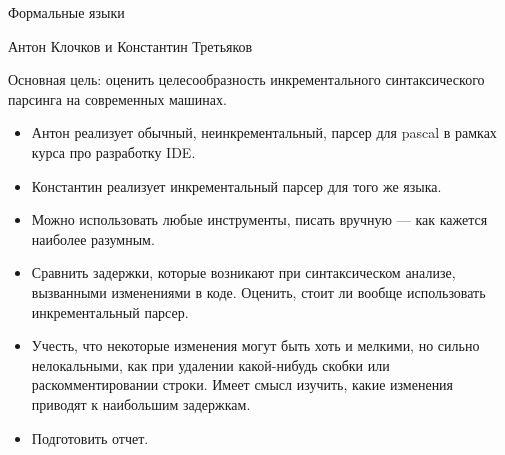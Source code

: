 \documentclass[12pt]{article}
\begin{document}
\begin{center}
{\LARGE Формальные языки}

\bigskip

{\Large Антон Клочков и Константин Третьяков}
\end{center}

\bigskip

Основная цель: оценить целесообразность инкрементального синтаксического парсинга на современных машинах.

\begin{itemize}
  \item Антон реализует обычный, неинкрементальный, парсер для pascal в рамках курса про разработку IDE.
  \item Константин реализует инкрементальный парсер для того же языка.
  \item Можно использовать любые инструменты, писать вручную --- как кажется наиболее разумным.
  \item Сравнить задержки, которые возникают при синтаксическом анализе, вызванными изменениями в коде. Оценить, стоит ли вообще использовать инкрементальный парсер.
  \item Учесть, что некоторые изменения могут быть хоть и мелкими, но сильно нелокальными, как при удалении какой-нибудь скобки или раскомментировании строки. Имеет смысл изучить, какие изменения приводят к наибольшим задержкам.
  \item Подготовить отчет.
\end{itemize}
\end{document}
